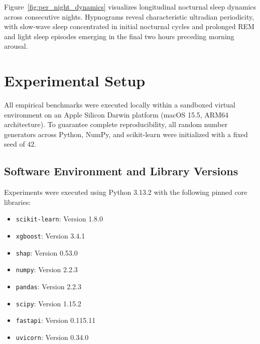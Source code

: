 \documentclass[journal,11pt,onecolumn]{IEEEtran}
\begin{document}
Figure~\ref{fig:per_night_dynamics} visualizes longitudinal nocturnal sleep dynamics across consecutive nights. Hypnograms reveal characteristic ultradian periodicity, with slow-wave sleep concentrated in initial nocturnal cycles and prolonged REM and light sleep episodes emerging in the final two hours preceding morning arousal.

\section{Experimental Setup}
\label{sec:experimental_setup}\hypertarget{sec:experimental_setup}{}

All empirical benchmarks were executed locally within a sandboxed virtual environment on an Apple Silicon Darwin platform (macOS 15.5, ARM64 architecture). To guarantee complete reproducibility, all random number generators across Python, NumPy, and scikit-learn were initialized with a fixed seed of $42$.

\subsection{Software Environment and Library Versions}
Experiments were executed using Python 3.13.2 with the following pinned core libraries:
\begin{itemize}[leftmargin=*]
    \item \texttt{scikit-learn}: Version 1.8.0
    \item \texttt{xgboost}: Version 3.4.1
    \item \texttt{shap}: Version 0.53.0
    \item \texttt{numpy}: Version 2.2.3
    \item \texttt{pandas}: Version 2.2.3
    \item \texttt{scipy}: Version 1.15.2
    \item \texttt{fastapi}: Version 0.115.11
    \item \texttt{uvicorn}: Version 0.34.0
\end{itemize}
\end{document}
